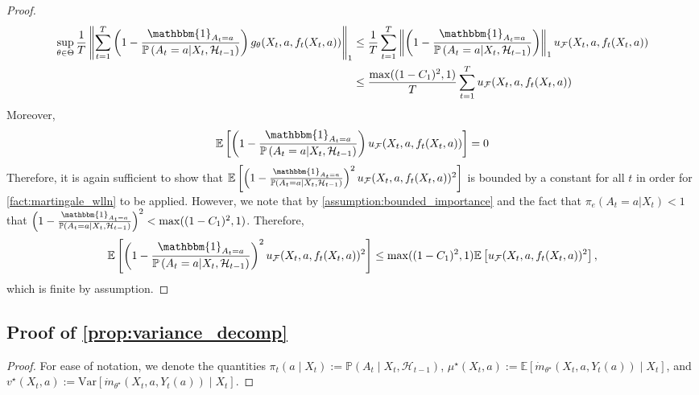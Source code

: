 \documentclass[11pt]{article}
\newcommand{\E}{\mathbb{E}}
\newcommand{\norm}[1]{\left\lVert#1\right\rVert}
\begin{document}
\begin{appendix}
\begin{proof}
\begin{align*}
   \sup_{\theta \in\Theta}\frac{1}{T}\norm{\sum_{t=1}^{T}\left(1 - \frac{\mathbbm{1}_{A_{t} = a} }{\mathbb{P} \left(A_{t} =a | X_{t},\mathcal{H}_{t-1} \right)}\right) g_{\theta}(X_{t},a,f_{t}(X_{t},a))}_{1} &\le \frac{1}{T}\sum_{t=1}^{T} \norm{\left(1 - \frac{\mathbbm{1}_{A_{t} = a} }{\mathbb{P} \left(A_{t} =a | X_{t},\mathcal{H}_{t-1} \right)}\right)}_{1} u_{\mathcal{F}}(X_{t},a,f_{t}(X_{t},a))  \\
   &\le \frac{\max((1-C_{1})^{2},1)}{T}\sum_{t=1}^{T} u_{\mathcal{F}}(X_{t},a,f_{t}(X_{t},a))
\end{align*}
Moreover, 
$$\mathbb{E} \left[\left(1 - \frac{\mathbbm{1}_{A_{t} = a} }{\mathbb{P} \left(A_{t} =a | X_{t},\mathcal{H}_{t-1} \right)}\right) u_{\mathcal{F}}(X_{t},a,f_{t}(X_{t},a)) \right]= 0$$
Therefore, it is again sufficient to show that $\mathbb{E} \left[\left(1 - \frac{\mathbbm{1}_{A_{t} = a} }{\mathbb{P} \left(A_{t} =a | X_{t},\mathcal{H}_{t-1} \right)}\right)^{2} u_{\mathcal{F}}(X_{t},a,f_{t}(X_{t},a))^{2}\right] $
is bounded by a constant for all $t$ in order for \cref{fact:martingale_wlln} to be applied.  However, we note that by \cref{assumption:bounded_importance} and the fact that $\pi_{e}(A_{t} =a | X_{t}) < 1$ that $\left(1 - \frac{\mathbbm{1}_{A_{t} = a} }{\mathbb{P} \left(A_{t} =a | X_{t},\mathcal{H}_{t-1} \right)}\right)^{2} < \max((1-C_{1})^{2},1) $. Therefore, 
$$\mathbb{E} \left[\left(1 - \frac{\mathbbm{1}_{A_{t} = a} }{\mathbb{P} \left(A_{t} =a | X_{t},\mathcal{H}_{t-1} \right)}\right)^{2} u_{\mathcal{F}}(X_{t},a,f_{t}(X_{t},a))^{2}\right] \le \max((1-C_{1})^{2},1) \mathbb{E}\left[ u_{\mathcal{F}}(X_{t},a,f_{t}(X_{t},a))^{2} \right],$$
which is finite by assumption. 
\fi

\end{proof}

\subsection{Proof of \cref{prop:variance_decomp}}

\begin{proof}
For ease of notation, we denote the quantities $\pi_t(a \mid X_t) :=\mathbb{P}(A_{t}\mid X_{t},\mathcal{H}_{t-1})$, $\mu^\star(X_t,a) := \E[\dot{m}_{\theta^{\star}}(X_t,a,Y_t(a)) \mid X_t]$, and $v^\star(X_t,a) := \text{Var}[\dot{m}_{\theta^{\star}}(X_t,a,Y_t(a)) \mid X_t]$.



\end{proof}
\end{appendix}
\end{document}

